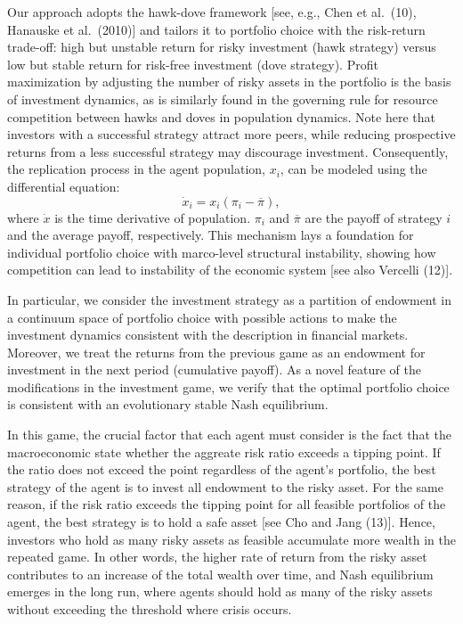 \documentclass[11pt,a4paper]{article}
\begin{document}
Our approach adopts the hawk-dove framework [see, e.g., Chen et al.\ (10), Hanauske et al.\ (2010)] and tailors it to portfolio choice with the risk-return trade-off: high but unstable return for risky investment (hawk strategy) versus low but stable return for risk-free investment (dove strategy). Profit maximization by adjusting the number of risky assets in the portfolio is the basis of investment dynamics, as is similarly found in the governing rule for resource competition between hawks and doves in population dynamics. Note here that investors with a successful strategy attract more peers, while reducing prospective returns from a less successful strategy may discourage investment. Consequently, the replication process in the agent population, $x_i$, can be modeled using the differential equation:
\begin{equation*}
	\dot{x}_{i} =  x_i  (\pi_i - \overline{\pi}),
\end{equation*}
\noindent where $\dot{x}$ is the time derivative of population. $\pi_i$ and  $\overline{\pi}$ are the payoff of strategy $i$ and the average payoff, respectively. This mechanism lays a foundation for individual portfolio choice with marco-level structural instability, showing how competition can lead to instability of the economic system [see also Vercelli (12)].

In particular, we consider the investment strategy as a partition of endowment in a continuum space of portfolio choice with possible actions to make the investment dynamics consistent with the description in financial markets. Moreover, we treat the returns from the previous game as an endowment for investment in the next period (cumulative payoff). As a novel feature of the modifications in the investment game, we verify that the optimal portfolio choice is consistent with an evolutionary stable Nash equilibrium. 

In this game, the crucial factor that each agent must consider is the fact that the macroeconomic state whether the aggreate risk ratio exceeds a tipping point. If the ratio does not exceed the point regardless of the agent's portfolio, the best strategy of the agent is to invest all endowment to the risky asset. For the same reason, if the risk ratio exceeds the tipping point for all feasible portfolios of the agent, the best strategy is to hold a safe asset [see Cho and Jang (13)]. Hence, investors who hold as many risky assets as feasible accumulate more wealth in the repeated game. In other words, the higher rate of return from the risky asset contributes to an increase of the total wealth over time, and Nash equilibrium emerges in the long run, where agents should hold as many of the risky assets without exceeding the threshold where crisis occurs.
\end{document}
